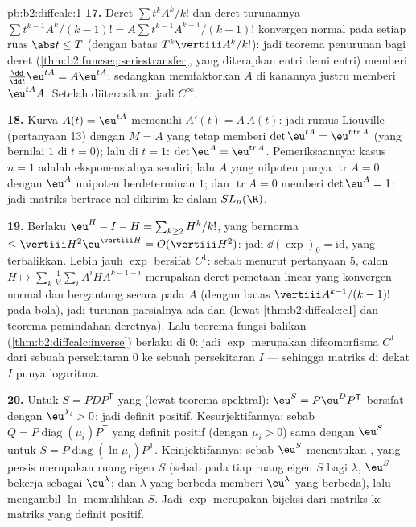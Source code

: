 \begin{solution}{pb:b2:diffcalc:1}
\textbf{17.} Deret $\sum t^kA^k/k!$ dan deret turunannya
$\sum t^{k-1}A^k/(k-1)! = A\sum t^{k-1}A^{k-1}/(k-1)!$ konvergen
normal pada setiap ruas $\abs t \leq T$ (dengan batas
$T^k\vertiii A^k/k!$): jadi teorema penurunan bagi deret
(\cref{thm:b2:funcseq:seriestransfer}, yang diterapkan entri demi entri)
memberi $\frac{\dd}{\dd t}\eu^{tA} = A\eu^{tA}$; sedangkan memfaktorkan $A$
di kanannya justru memberi $\eu^{tA}A$. Setelah diiterasikan: jadi $C^\infty$.

\textbf{18.} Kurva $A(t) = \eu^{tA}$ memenuhi $A'(t) = A\,A(t)$:
jadi rumus Liouville (pertanyaan 13) dengan $M = A$ yang tetap memberi
$\det\eu^{tA} = \eu^{t\operatorname{tr}A}$ (yang bernilai $1$ di $t =
0$); lalu di $t = 1$: $\det\eu^A = \eu^{\operatorname{tr}A}$.
Pemeriksaannya: kasus $n = 1$ adalah eksponensialnya sendiri; lalu $A$ yang nilpoten punya
$\operatorname{tr}A = 0$ dengan $\eu^A$ unipoten berdeterminan
$1$; dan $\operatorname{tr}A = 0$ memberi $\det\eu^A = 1$: jadi
matriks bertrace nol dikirim ke dalam $SL_n(\R)$.

\textbf{19.} Berlaku $\eu^H - I - H = \sum_{k\geq2}H^k/k!$, yang bernorma
$\leq \vertiii H^2\eu^{\vertiii H} = O(\vertiii H^2)$: jadi
$\dd(\exp)_0 = \mathrm{id}$, yang terbalikkan. Lebih jauh $\exp$ bersifat
$C^1$: sebab menurut pertanyaan 5, calon  $H \mapsto
\sum_k\frac1{k!}\sum_iA^iHA^{k-1-i}$ merupakan deret pemetaan linear yang
konvergen normal dan bergantung secara  pada $A$ (dengan batas
$\vertiii A^{k-1}/(k-1)!$ pada bola), jadi turunan parsialnya ada dan
 (lewat \cref{thm:b2:diffcalc:c1} dan teorema pemindahan
deretnya). Lalu teorema fungsi balikan
(\cref{thm:b2:diffcalc:inverse}) berlaku di $0$: jadi $\exp$ merupakan
difeomorfisma $C^1$ dari sebuah persekitaran $0$ ke sebuah
persekitaran $I$ --- sehingga matriks di dekat $I$ punya logaritma.

\textbf{20.} Untuk $S = PDP^{\mathsf T}$ yang  (lewat teorema
spektral): $\eu^S = P\eu^DP^{\mathsf T}$ bersifat  dengan
 $\eu^{\lambda_i} > 0$: jadi definit positif.
Kesurjektifannya: sebab $Q =
P\operatorname{diag}(\mu_i)P^{\mathsf T}$ yang definit positif (dengan $\mu_i > 0$) sama dengan
$\eu^S$ untuk $S = P\operatorname{diag}(\ln\mu_i)P^{\mathsf T}$.
Keinjektifannya: sebab $\eu^S$ menentukan , yang
persis merupakan ruang eigen $S$ (sebab pada tiap ruang eigen $S$ bagi $\lambda$,
$\eu^S$ bekerja sebagai $\eu^\lambda$; dan $\lambda$ yang berbeda memberi
$\eu^\lambda$ yang berbeda), lalu mengambil $\ln$ 
memulihkan $S$. Jadi $\exp$ merupakan bijeksi dari matriks 
ke matriks yang definit positif.


\end{solution}
